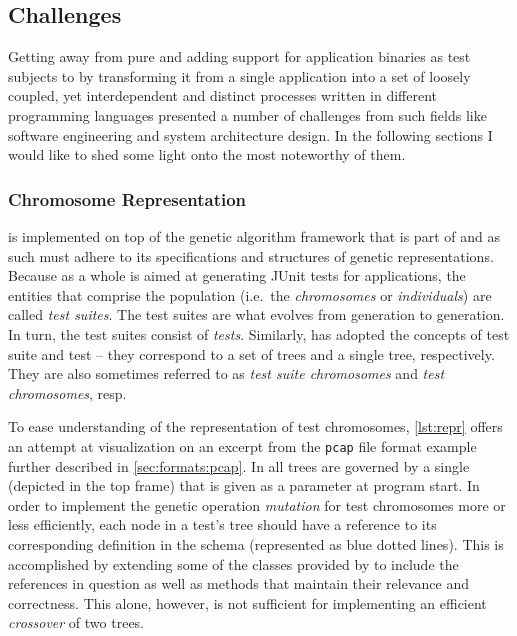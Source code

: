 \subsection{Challenges}
Getting away from pure \java and adding support for application binaries as test subjects 
to \xmlmate by transforming it from 
a single \java application into a set of loosely coupled, yet interdependent and distinct 
processes written in different programming languages presented a number of challenges from 
such fields like software engineering and system architecture design. 
In the following sections I would like to shed some light onto 
the most noteworthy of them.
\subsubsection{Chromosome Representation}
\label{sec:repr}
\xmlmate is implemented on top of the genetic algorithm framework that is part of 
\evosuite{}\cite{fraser2013whole} and as such must adhere to its specifications and structures 
of genetic representations. 
Because \evosuite as a whole is aimed at generating {\small JUnit} tests for \java applications, 
the entities that comprise the population  (i.e.\ the \emph{chromosomes} or \emph{individuals}) 
are called \emph{test suites}. The test suites are what evolves from generation to generation.
In turn, the test suites consist of \emph{tests}. Similarly, \xmlmate has adopted the concepts of 
test suite and test -- they correspond to a set of \xml trees and a single \xml tree, respectively. 
They are also sometimes referred to as \emph{test suite chromosomes} and \emph{test chromosomes}, resp.

To ease understanding of the representation of \xml test chromosomes, \cref{lst:repr} offers an attempt at
visualization on an excerpt from the \texttt{pcap} file format example further described in
\cref{sec:formats:pcap}. In \xmlmate all \xml trees are governed by a single \xsd (depicted in the top frame)
that is given as a parameter at program start. In order to implement the genetic operation \emph{mutation} for
test chromosomes more or less efficiently, each node in a test's \xml tree should have a reference to its
corresponding definition in the schema (represented as blue dotted lines). This is accomplished by extending
some of the \java classes provided by \xom to include the references in question as well as methods that maintain
their relevance and correctness. This alone, however, is not sufficient for implementing an efficient
\emph{crossover} of two \xml trees.

